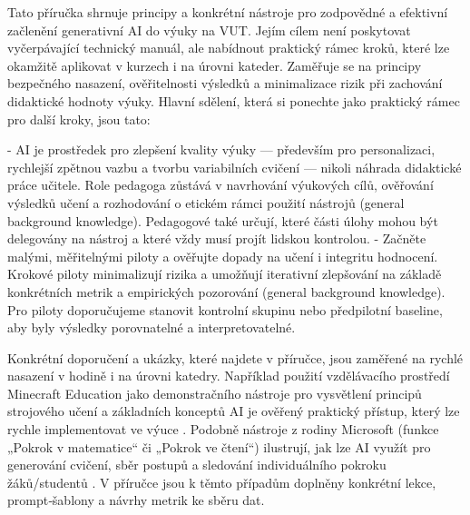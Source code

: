 Tato příručka shrnuje principy a konkrétní nástroje pro zodpovědné a efektivní začlenění generativní AI do výuky na VUT. Jejím cílem není poskytovat vyčerpávající technický manuál, ale nabídnout praktický rámec kroků, které lze okamžitě aplikovat v kurzech i na úrovni kateder. Zaměřuje se na principy bezpečného nasazení, ověřitelnosti výsledků a minimalizace rizik při zachování didaktické hodnoty výuky. Hlavní sdělení, která si ponechte jako praktický rámec pro další kroky, jsou tato:

- AI je prostředek pro zlepšení kvality výuky — především pro personalizaci, rychlejší zpětnou vazbu a tvorbu variabilních cvičení — nikoli náhrada didaktické práce učitele. Role pedagoga zůstává v navrhování výukových cílů, ověřování výsledků učení a rozhodování o etickém rámci použití nástrojů (general background knowledge). Pedagogové také určují, které části úlohy mohou být delegovány na nástroj a které vždy musí projít lidskou kontrolou.
- Začněte malými, měřitelnými piloty a ověřujte dopady na učení i integritu hodnocení. Krokové piloty minimalizují rizika a umožňují iterativní zlepšování na základě konkrétních metrik a empirických pozorování (general background knowledge). Pro piloty doporučujeme stanovit kontrolní skupinu nebo předpilotní baseline, aby byly výsledky porovnatelné a interpretovatelné.

Konkrétní doporučení a ukázky, které najdete v příručce, jsou zaměřené na rychlé nasazení v hodině i na úrovni katedry. Například použití vzdělávacího prostředí Minecraft Education jako demonstračního nástroje pro vysvětlení principů strojového učení a základních konceptů AI je ověřený praktický přístup, který lze rychle implementovat ve výuce \cite{kb_ai_101_tipu_pdf_04e4a115_page_15_2}. Podobně nástroje z rodiny Microsoft (funkce „Pokrok v matematice“ či „Pokrok ve čtení“) ilustrují, jak lze AI využít pro generování cvičení, sběr postupů a sledování individuálního pokroku žáků/studentů \cite{kb_ai_101_tipu_pdf_04e4a115_page_8_1, kb_ai_101_tipu_pdf_04e4a115_page_7_1}. V příručce jsou k těmto případům doplněny konkrétní lekce, prompt‑šablony a návrhy metrik ke sběru dat.

